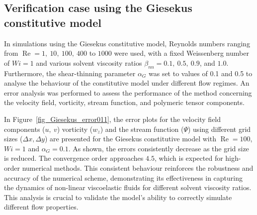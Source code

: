 \documentclass[preprint, 12pt]{elsarticle}
\begin{document}
\subsection{Verification case using the Giesekus constitutive model}
\label{subsec_giesekus}

In simulations using the Giesekus constitutive model, Reynolds numbers ranging from $\operatorname{Re} = 1,\ 10,\ 100,\ 400$ to $1000$ were used, with a fixed Weissenberg number of $Wi = 1$ and various solvent viscosity ratios $\beta_{nn} = 0.1,\ 0.5,\ 0.9$, and $1.0$. Furthermore, the shear-thinning parameter $\alpha_G$ was set to values of 0.1 and 0.5 to analyse the behaviour of the constitutive model under different flow regimes. An error analysis was performed to assess the performance of the method concerning the velocity field, vorticity, stream function, and polymeric tensor components.

In Figure~\ref{fig_Giesekus_error011}, the error plots for the velocity field components ($u,~v$) vorticity ($w_z$) and the stream function ($\Psi$) using different grid sizes ($\Delta x, \Delta y$) are presented for the Giesekus constitutive model with $\operatorname{Re} = 100$, $Wi = 1$ and $\alpha_G = 0.1$. As shown, the errors consistently decrease as the grid size is reduced. The convergence order approaches $4.5$, which is expected for high-order numerical methods. This consistent behaviour reinforces the robustness and accuracy of the numerical scheme, demonstrating its effectiveness in capturing the dynamics of non-linear viscoelastic fluids for different solvent viscosity ratios. This analysis is crucial to validate the model’s ability to correctly simulate different flow properties.
\end{document}
